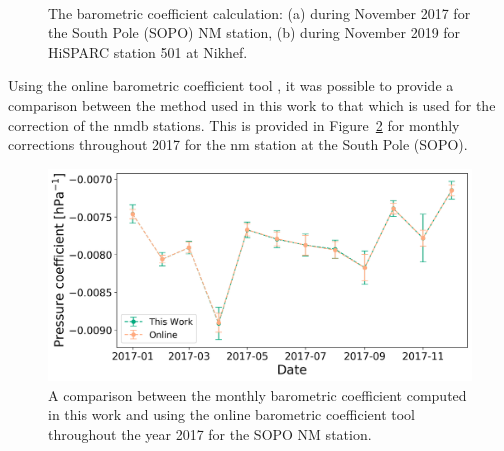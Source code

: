 \begin{figure}[ht]
	\centering
	 \\
	
	\caption{The barometric coefficient calculation: (a) during November 2017 for the South Pole (SOPO) NM station, (b) during November 2019 for HiSPARC station 501 at Nikhef.}
	\label{fig:barometric_fit}
\end{figure}


Using the online barometric coefficient tool \citep{paschalis_online_2013}, it was possible to provide a comparison between the method used in this work to that which is used for the correction of the \gls{nmdb} stations. This is provided in Figure~\ref{fig:NM_beta_variation} for monthly corrections throughout 2017 for the \gls{nm} station at the South Pole (SOPO).

\begin{figure}[ht]
	\centering
	\includegraphics[width=0.65\columnwidth]{SOPO_beta_2017_rescale.png}
	\caption{A comparison between the monthly barometric coefficient computed in this work and using the online barometric coefficient tool throughout the year 2017 for the SOPO NM station.}
	\label{fig:NM_beta_variation}
\end{figure}


